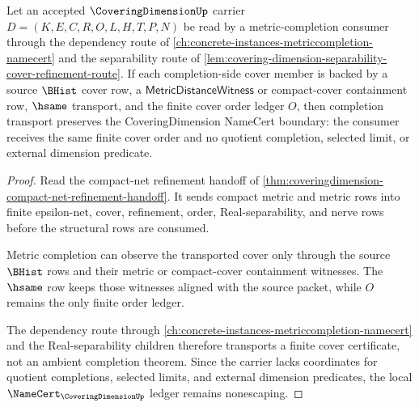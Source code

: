 \begin{theorem}
\label{thm:coveringdimension-metric-completion-cover-transport}
Let an accepted $\CoveringDimensionUp$ carrier $D=(K,E,C,R,O,L,H,T,P,N)$ be read by a metric-completion consumer through the dependency route of \autoref{ch:concrete-instances-metriccompletion-namecert} and the separability route of \autoref{lem:covering-dimension-separability-cover-refinement-route}. If each completion-side cover member is backed by a source $\BHist$ cover row, a $\mathsf{MetricDistanceWitness}$ or compact-cover containment row, $\hsame$ transport, and the finite cover order ledger $O$, then completion transport preserves the CoveringDimension NameCert boundary: the consumer receives the same finite cover order and no quotient completion, selected limit, or external dimension predicate.
\end{theorem}
\begin{proof}
Read the compact-net refinement handoff of \autoref{thm:coveringdimension-compact-net-refinement-handoff}. It sends compact metric and metric rows into finite epsilon-net, cover, refinement, order, Real-separability, and nerve rows before the structural rows are consumed.

Metric completion can observe the transported cover only through the source $\BHist$ rows and their metric or compact-cover containment witnesses. The $\hsame$ row keeps those witnesses aligned with the source packet, while $O$ remains the only finite order ledger.

The dependency route through \autoref{ch:concrete-instances-metriccompletion-namecert} and the Real-separability children therefore transports a finite cover certificate, not an ambient completion theorem. Since the carrier lacks coordinates for quotient completions, selected limits, and external dimension predicates, the local $\NameCert_{\CoveringDimensionUp}$ ledger remains nonescaping.
\end{proof}
